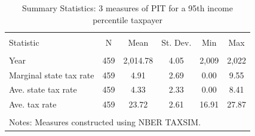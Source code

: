 
\begin{table}[!htbp] \centering 
  \caption{Summary Statistics: 3 measures of PIT for a 95th income percentile taxpayer} 
  \label{} 
\small 
\begin{tabular}{@{\extracolsep{5pt}}lccccc} 
\\[-1.8ex]\hline 
\hline \\[-1.8ex] 
Statistic & \multicolumn{1}{c}{N} & \multicolumn{1}{c}{Mean} & \multicolumn{1}{c}{St. Dev.} & \multicolumn{1}{c}{Min} & \multicolumn{1}{c}{Max} \\ 
\hline \\[-1.8ex] 
Year & 459 & 2,014.78 & 4.05 & 2,009 & 2,022 \\ 
Marginal state tax rate & 459 & 4.91 & 2.69 & 0.00 & 9.55 \\ 
Ave. state tax rate & 459 & 4.33 & 2.33 & 0.00 & 8.41 \\ 
Ave. tax rate & 459 & 23.72 & 2.61 & 16.91 & 27.87 \\ 
\hline \\[-1.8ex] 
\multicolumn{6}{l}{Notes: Measures constructed using NBER TAXSIM.} \\ 
\end{tabular} 
\end{table} 
